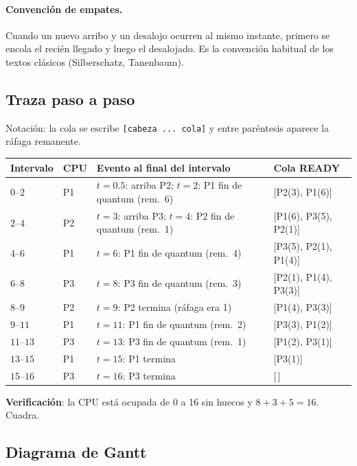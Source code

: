 \documentclass[11pt,a4paper]{article}
\begin{document}
\paragraph{Convención de empates.} Cuando un nuevo arribo y un
desalojo ocurren al mismo instante, primero se encola el recién
llegado y luego el desalojado. Es la convención habitual de los
textos clásicos (Silberschatz, Tanenbaum).

\subsection*{Traza paso a paso}

Notación: la cola se escribe \texttt{[cabeza ... cola]} y entre
paréntesis aparece la ráfaga remanente.

\begin{center}
\small
\begin{tabular}{@{}llp{6cm}l@{}}
\toprule
Intervalo & CPU & Evento al final del intervalo & Cola READY \\
\midrule
$0$--$2$   & P1 & $t=0.5$: arriba P2; $t=2$: P1 fin de quantum (rem.\ 6) & [P2(3), P1(6)] \\
$2$--$4$   & P2 & $t=3$: arriba P3; $t=4$: P2 fin de quantum (rem.\ 1)   & [P1(6), P3(5), P2(1)] \\
$4$--$6$   & P1 & $t=6$: P1 fin de quantum (rem.\ 4)                    & [P3(5), P2(1), P1(4)] \\
$6$--$8$   & P3 & $t=8$: P3 fin de quantum (rem.\ 3)                    & [P2(1), P1(4), P3(3)] \\
$8$--$9$   & P2 & $t=9$: P2 termina (ráfaga era 1)                      & [P1(4), P3(3)] \\
$9$--$11$  & P1 & $t=11$: P1 fin de quantum (rem.\ 2)                   & [P3(3), P1(2)] \\
$11$--$13$ & P3 & $t=13$: P3 fin de quantum (rem.\ 1)                   & [P1(2), P3(1)] \\
$13$--$15$ & P1 & $t=15$: P1 termina                                    & [P3(1)] \\
$15$--$16$ & P3 & $t=16$: P3 termina                                    & [\,] \\
\bottomrule
\end{tabular}
\end{center}

\textbf{Verificación}: la CPU está ocupada de 0 a 16 sin huecos y
$8 + 3 + 5 = 16$. Cuadra.

\subsection*{Diagrama de Gantt}
\end{document}

